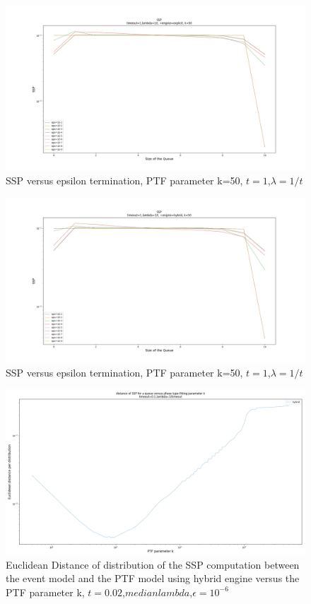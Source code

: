 \documentclass[paper=a4, fontsize=11pt]{scrartcl}
\numberwithin{equation}{section}		%
\numberwithin{figure}{section}			%
\numberwithin{table}{section}				%
\begin{document}
	\begin{figure}
		\centering
		\includegraphics[width=20cm]{picture/epsilon_explicit.png}
		\caption{SSP versus epsilon termination, PTF parameter k=50,	$t=1$,$\lambda=1/t$}
		\label{fig:epsilon_explicit}
	\end{figure}
	
	\begin{figure}
		\centering
		\includegraphics[width=20cm]{picture/epsilon_hybrid.png}
		\caption{SSP versus epsilon termination, PTF parameter k=50,	$t=1$,$\lambda=1/t$}
		\label{fig:epsilon_hybrid}
	\end{figure}
	
		\begin{figure}
			\centering
			\includegraphics[width=17cm]{picture/distance_hybrid2.png}
			\caption{Euclidean Distance of distribution of the SSP computation between the event model and the PTF model using hybrid engine versus the PTF parameter k,	$t=0.02$,$median lambda$,$\epsilon=10^{-6}$}
			\label{fig:dist_hybrid_50k}
		\end{figure}
		

\end{document}
